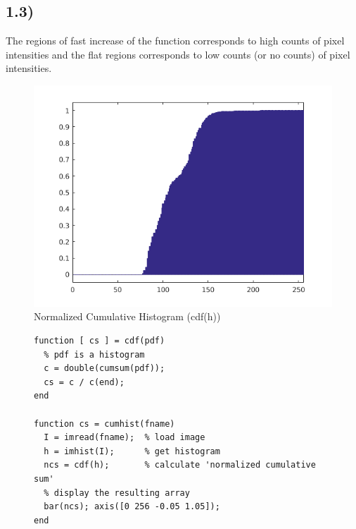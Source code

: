 \documentclass[a4paper]{article}
\begin{document}
\newpage
\subsection*{1.3)}

The regions of fast increase of the function corresponds to high counts of pixel intensities and the flat regions corresponds to low counts (or no counts) of pixel intensities.

\begin{figure}[h]
  \centering
  \includegraphics[width=\linewidth]{./1_3.png}
  \caption{Normalized Cumulative Histogram (cdf(h))}
  \label{fig:1.3}
\end{figure}

\begin{figure}[h!]
  \begin{lstlisting}[caption='Code to display Cumulative Histogram']
function [ cs ] = cdf(pdf)
  % pdf is a histogram
  c = double(cumsum(pdf));
  cs = c / c(end);
end

function cs = cumhist(fname)
  I = imread(fname);  % load image
  h = imhist(I);      % get histogram
  ncs = cdf(h);       % calculate 'normalized cumulative sum'
  % display the resulting array
  bar(ncs); axis([0 256 -0.05 1.05]);
end\end{lstlisting}
\end{figure}
\end{document}
